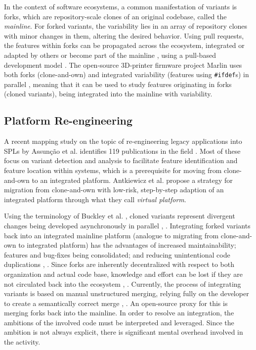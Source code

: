 In the context of software ecosystems, a common manifestation of variants is forks, which are repository-scale clones of an original codebase, called the \textit{mainline}. For forked variants, the variability lies in an array of repository clones with minor changes in them, altering the desired behavior. Using pull requests, the features within forks can be propagated across the ecosystem, integrated or adapted by others or become part of the mainline \cite{stanciulescu2015}, using a pull-based development model \cite{gousios2014pullreq}. The open-source 3D-printer firmware project Marlin uses both forks (clone-and-own) and integrated variability (features using \texttt{\#ifdef}s) in parallel \cite{stanciulescu2015}, meaning that it can be used to study features originating in forks (cloned variants), being integrated into the mainline with variability.

\subsection{Platform Re-engineering}
A recent mapping study on the topic of re-engineering legacy applications into SPLs by Assun{\c{c}}{\~a}o et al. identifies 119 publications in the field \cite{assuncao2017mapping}. Most of these focus on variant detection and analysis to facilitate feature identification and feature location within systems, which is a prerequisite for moving from clone-and-own to an integrated platform. Antkiewicz et al. \cite{antkiewicz2014flexible} propose a strategy for migration from clone-and-own with low-risk, step-by-step adaption of an integrated platform through what they call \textit{virtual platform}. 

Using the terminology of Buckley et al. \cite{buckley2005}, cloned variants represent divergent changes being developed asynchronously in parallel \cite{mens2002}, \cite{stanciulescu2015}. Integrating forked variants back into an integrated mainline platform (analogue to migrating from clone-and-own to integrated platform) has the advantages of increased maintainability; features and bug-fixes being consolidated; and reducing unintentional code duplications \cite{schmorleiz2016similarity}, \cite{stanciulescu2015}. Since forks are inherently decentralized with respect to both organization and actual code base, knowledge and effort can be lost if they are not circulated back into the ecosystem \cite{stanciulescu2015}, \cite{gousios2015}.
Currently, the process of integrating variants is based on manual unstructured merging, relying fully on the developer to create a semantically correct merge \cite{mens2002}, \cite{apel2011}. An open-source proxy for this is merging forks back into the mainline. In order to resolve an integration, the ambitions of the involved code must be interpreted and leveraged. Since the ambition is not always explicit, there is significant mental overhead involved in the activity.

